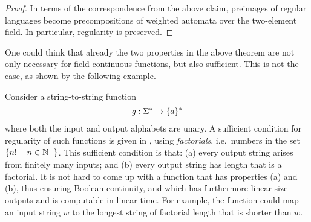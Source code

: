 \begin{proof}
        In terms of the correspondence from the above claim, preimages of regular languages become precompositions of weighted automata over the two-element field. In particular, regularity is preserved. 
\end{proof}

One could think that already the two properties in the above theorem are not only necessary for field continuous functions, but also sufficient. This is not the case, as shown by the following example.

\begin{myexample}[Factorials]
    \label{ex:not-regular-but-continuous-over-finite-fields}
    Consider a string-to-string function 
    \begin{align*}
    g : \Sigma^* \to \{a\}^*
    \end{align*}
    where both the input and output alphabets are unary. A sufficient condition for regularity of such functions is given in  \cite[Example 2.12]{bojanczykTitoRegular23}, using \emph{factorials}, i.e.~numbers in the set $\setbuild{n!}{$n \in \Nat$}$. This sufficient condition is that: (a) every output string arises from finitely many inputs; and (b) every output string has length that is a factorial. 
    It is not hard to come up with a function that has  properties (a) and (b), thus ensuring Boolean continuity, and which has furthermore linear size outputs and is computable in linear time. For example, the function could map an input string $w$ to the longest string of factorial length that is shorter than $w$. 
\end{myexample}
